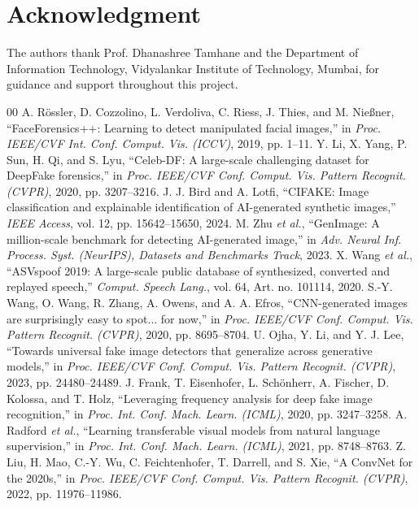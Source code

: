 \documentclass[conference]{IEEEtran}
\begin{document}
\section*{Acknowledgment}
The authors thank Prof. Dhanashree Tamhane and the Department of Information Technology, Vidyalankar Institute of Technology, Mumbai, for guidance and support throughout this project.

\begin{thebibliography}{00}
 A. R\"ossler, D. Cozzolino, L. Verdoliva, C. Riess, J. Thies, and M. Nie{\ss}ner, ``FaceForensics++: Learning to detect manipulated facial images,'' in \emph{Proc. IEEE/CVF Int. Conf. Comput. Vis. (ICCV)}, 2019, pp. 1--11.
 Y. Li, X. Yang, P. Sun, H. Qi, and S. Lyu, ``Celeb-DF: A large-scale challenging dataset for DeepFake forensics,'' in \emph{Proc. IEEE/CVF Conf. Comput. Vis. Pattern Recognit. (CVPR)}, 2020, pp. 3207--3216.
 J. J. Bird and A. Lotfi, ``CIFAKE: Image classification and explainable identification of AI-generated synthetic images,'' \emph{IEEE Access}, vol. 12, pp. 15642--15650, 2024.
 M. Zhu \emph{et al.}, ``GenImage: A million-scale benchmark for detecting AI-generated image,'' in \emph{Adv. Neural Inf. Process. Syst. (NeurIPS), Datasets and Benchmarks Track}, 2023.
 X. Wang \emph{et al.}, ``ASVspoof 2019: A large-scale public database of synthesized, converted and replayed speech,'' \emph{Comput. Speech Lang.}, vol. 64, Art. no. 101114, 2020.
 S.-Y. Wang, O. Wang, R. Zhang, A. Owens, and A. A. Efros, ``CNN-generated images are surprisingly easy to spot... for now,'' in \emph{Proc. IEEE/CVF Conf. Comput. Vis. Pattern Recognit. (CVPR)}, 2020, pp. 8695--8704.
 U. Ojha, Y. Li, and Y. J. Lee, ``Towards universal fake image detectors that generalize across generative models,'' in \emph{Proc. IEEE/CVF Conf. Comput. Vis. Pattern Recognit. (CVPR)}, 2023, pp. 24480--24489.
 J. Frank, T. Eisenhofer, L. Sch\"onherr, A. Fischer, D. Kolossa, and T. Holz, ``Leveraging frequency analysis for deep fake image recognition,'' in \emph{Proc. Int. Conf. Mach. Learn. (ICML)}, 2020, pp. 3247--3258.
 A. Radford \emph{et al.}, ``Learning transferable visual models from natural language supervision,'' in \emph{Proc. Int. Conf. Mach. Learn. (ICML)}, 2021, pp. 8748--8763.
 Z. Liu, H. Mao, C.-Y. Wu, C. Feichtenhofer, T. Darrell, and S. Xie, ``A ConvNet for the 2020s,'' in \emph{Proc. IEEE/CVF Conf. Comput. Vis. Pattern Recognit. (CVPR)}, 2022, pp. 11976--11986.

\end{thebibliography}
\end{document}
